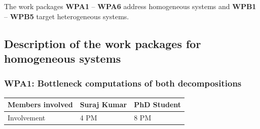 \documentclass[a4paper,11pt]{article}
\begin{document}
	
	
	

	
	
	
	The work packages \textbf{WPA1} -- \textbf{WPA6} address homogeneous systems and \textbf{WPB1} -- \textbf{WPB5} target heterogeneous systems.
	\subsection{Description of the work packages for homogeneous systems}
	\label{sec:org:wp:homo}
	
	
	\subsubsection{\textbf{WPA1}: Bottleneck computations of both decompositions}
	\begin{table}[H]
		\begin{tabular}{lll}
			\hline
			\cellcolor{blue2}
			Members involved & Suraj Kumar& PhD Student \\
			\hline
			\cellcolor{orange2}
			Involvement      & 4 PM            & 8 PM \\
			\hline
		\end{tabular}
	\end{table}
	
\end{document}
